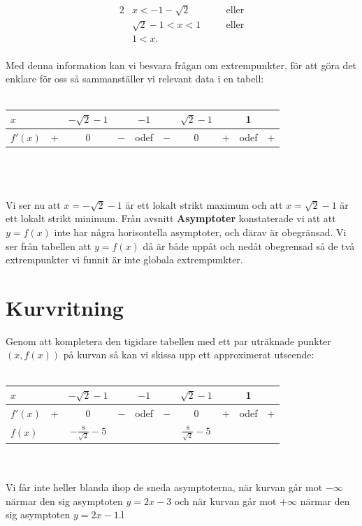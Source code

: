 \documentclass{article}
\begin{document}
\begin{alignat*}{2}
  & x < -1 - \sqrt{2} &&\quad\text{eller}\\
  & \sqrt{2} - 1 < x < 1 &&\quad\text{eller} \\
  & 1 < x\text{.} &&
\end{alignat*}
\\
Med denna information kan vi besvara frågan om extrempunkter, för att göra det enklare för oss så sammanställer vi relevant data i en tabell:
\\
\\
\begin{tabular}[c]{l | c | c | c | c | c | c | c | c | c}
  $x$     &   & $-\sqrt{2} - 1$ &     & $-1$ &     & $\sqrt{2} - 1$ &     & 1    &     \\ \hline
  $f'(x)$ & + & $0$             & $-$ & odef & $-$ & $0$            & $+$ & odef & $+$ \\
\end{tabular}
\\
\\
\\
Vi ser nu att $x = -\sqrt{2} - 1$ är ett lokalt strikt maximum och att $x = \sqrt{2} - 1$ är ett lokalt strikt minimum. Från avsnitt \textbf{Asymptoter} konstaterade vi att att $y = f(x)$ inte har några horisontella asymptoter, och därav är obegränsad. Vi ser från tabellen att $y = f(x)$ då är både uppåt och nedåt obegrensad så de två extrempunkter vi funnit är inte globala extrempunkter.

\section*{Kurvritning}

Genom att kompletera den tigidare tabellen med ett par uträknade punkter $(x, f(x))$ på kurvan så kan vi skissa upp ett approximerat utseende:
\\
\\
\begin{tabular}[c]{l | c | c | c | c | c | c | c | c | c}
  $x$     &   & $-\sqrt{2} - 1$ &     & $-1$ &     & $\sqrt{2} - 1$ &     & 1    &     \\ \hline
  $f'(x)$ & + & $0$             & $-$ & odef & $-$ & $0$            & $+$ & odef & $+$ \\
  $f(x)$  &   & $-\tfrac{8}{\sqrt{2}} - 5$ &&&     & $\tfrac{8}{\sqrt{2}} - 5$ &&&
\end{tabular}
\\
\\
Vi får inte heller blanda ihop de sneda asymptoterna, när kurvan går mot $-\infty$ närmar den sig asymptoten $y = 2x - 3$ och när kurvan går mot $+\infty$ närmar den sig asymptoten $y = 2x - 1$.l
\end{document}

